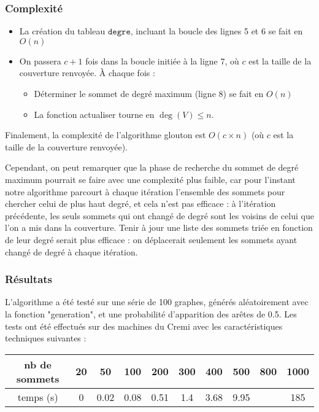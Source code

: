 \documentclass[a4paper,10pt]{article}
\newcommand*{\itemb}{\item[$\bullet$]}
\newcommand*{\itemt}{\item[$\blacktriangleright$]}
\begin{document}
\subsubsection{Complexité}

\begin{itemize}
 \itemb La création du tableau $\mathtt{degre}$, incluant la boucle des lignes 5 et 6 se fait en $O(n)$
 \itemb On passera $c+1$ fois dans la boucle initiée à la ligne 7, où $c$ est la taille de la couverture renvoyée. À chaque fois :
\begin{itemize}
\itemt Déterminer le sommet de degré maximum (ligne 8) se fait en $O(n)$
\itemt La fonction actualiser tourne en $\deg(V)\leqslant n$.
\end{itemize}
\end{itemize}

Finalement, la complexité de l'algorithme glouton est $O(c\times n)$ (où $c$ est la taille de la couverture renvoyée).

Cependant, on peut remarquer que la phase de recherche du sommet de degré maximum pourrait se faire avec une complexité plus faible, car pour l'instant notre algorithme parcourt à chaque itération l'ensemble des sommets pour chercher celui de plus haut degré, et cela n'est pas efficace : à l'itération précédente, les seuls sommets qui ont changé de degré sont les voisins de celui que l'on a mis dans la couverture. Tenir à jour une liste des sommets triée en fonction de leur degré serait plus efficace : on déplacerait seulement les sommets ayant changé de degré à chaque itération.

\subsubsection{Résultats}

L'algorithme a été testé sur une série de 100 graphes, générés aléatoirement avec la fonction "generation", et une probabilité d'apparition des arêtes de 0.5. 
Les tests ont été effectués sur des machines du Cremi avec les caractéristiques techniques suivantes :

\bigskip
\begin{tabular}{|c|c|c|c|c|c|c|c|c|c|}
	\hline 
	nb de sommets & 20 & 50 & 100 & 200 & 300 & 400 & 500 & 800 & 1000 \\
	\hline
	temps (s) & 0 & 0.02 & 0.08 & 0.51 & 1.4 & 3.68 & 9.95 &  & 185 \\
	\hline
\end{tabular}
\end{document}
